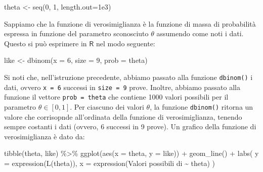 \documentclass[
]{memoir}
\newenvironment{Shaded}{\begin{snugshade}}{\end{snugshade}}
\newcommand{\AttributeTok}[1]{\textcolor[rgb]{0.77,0.63,0.00}{#1}}
\newcommand{\DecValTok}[1]{\textcolor[rgb]{0.00,0.00,0.81}{#1}}
\newcommand{\FloatTok}[1]{\textcolor[rgb]{0.00,0.00,0.81}{#1}}
\newcommand{\FunctionTok}[1]{\textcolor[rgb]{0.00,0.00,0.00}{#1}}
\newcommand{\NormalTok}[1]{#1}
\newcommand{\OtherTok}[1]{\textcolor[rgb]{0.56,0.35,0.01}{#1}}
\newcommand{\SpecialCharTok}[1]{\textcolor[rgb]{0.00,0.00,0.00}{#1}}
\newcommand{\StringTok}[1]{\textcolor[rgb]{0.31,0.60,0.02}{#1}}
\newcommand{\R}{\textsf{R}} %
\theoremstyle{definition}
\theoremstyle{definition}
\theoremstyle{definition}
\theoremstyle{definition}
\theoremstyle{remark}
\begin{document}
\begin{Shaded}
\begin{Highlighting}[]
\NormalTok{theta }\OtherTok{\textless{}{-}} \FunctionTok{seq}\NormalTok{(}\DecValTok{0}\NormalTok{, }\DecValTok{1}\NormalTok{, }\AttributeTok{length.out=}\FloatTok{1e3}\NormalTok{)}
\end{Highlighting}
\end{Shaded}

Sappiamo che la funzione di verosimiglianza è la funzione di massa di probabilità espressa in funzione del parametro sconosciuto \(\theta\) assumendo come noti i dati. Questo si può esprimere in \(\R\) nel modo seguente:

\begin{Shaded}
\begin{Highlighting}[]
\NormalTok{like }\OtherTok{\textless{}{-}} \FunctionTok{dbinom}\NormalTok{(}\AttributeTok{x =} \DecValTok{6}\NormalTok{, }\AttributeTok{size =} \DecValTok{9}\NormalTok{, }\AttributeTok{prob =}\NormalTok{ theta)}
\end{Highlighting}
\end{Shaded}

Si noti che, nell'istruzione precedente, abbiamo passato alla funzione \texttt{dbinom()} i dati, ovvero \texttt{x\ =\ 6} successi in \texttt{size\ =\ 9} prove. Inoltre, abbiamo passato alla funzione il vettore \texttt{prob\ =\ theta} che contiene 1000 valori possibili per il parametro \(\theta \in [0, 1]\). Per ciascuno dei valori \(\theta\), la funzione \texttt{dbinom()} ritorna un valore che corrisopnde all'ordinata della funzione di verosimiglianza, tenendo sempre costanti i dati (ovvero, 6 successi in 9 prove). Un grafico della funzione di verosimiglianza è dato da:

\begin{Shaded}
\begin{Highlighting}[]
\FunctionTok{tibble}\NormalTok{(theta, like) }\SpecialCharTok{\%\textgreater{}\%} 
  \FunctionTok{ggplot}\NormalTok{(}\FunctionTok{aes}\NormalTok{(}\AttributeTok{x =}\NormalTok{ theta, }\AttributeTok{y =}\NormalTok{ like)) }\SpecialCharTok{+}
  \FunctionTok{geom\_line}\NormalTok{() }\SpecialCharTok{+}
  \FunctionTok{labs}\NormalTok{(}
    \AttributeTok{y =} \FunctionTok{expression}\NormalTok{(}\FunctionTok{L}\NormalTok{(theta)),}
    \AttributeTok{x =} \FunctionTok{expression}\NormalTok{(}\StringTok{\textquotesingle{}Valori possibili di\textquotesingle{}} \SpecialCharTok{\textasciitilde{}}\NormalTok{ theta)}
\NormalTok{  )}
\end{Highlighting}
\end{Shaded}
\end{document}
